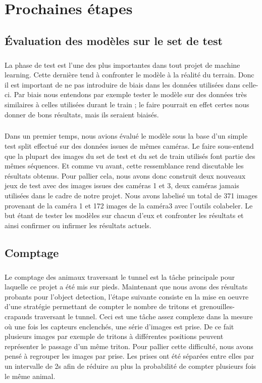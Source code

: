 \chapter{Prochaines étapes}\label{chap:next_steps}
\section{Évaluation des modèles sur le set de test}
\paragraph{}La phase de test est l’une des plus importantes dans tout projet de machine learning.  Cette dernière tend à confronter le modèle à la réalité du terrain. Donc il est important de ne pas introduire de biais dans les données utilisées dans celle-ci. Par biais nous entendons par exemple tester le modèle sur des données très similaires à celles utilisées durant le train ; le faire pourrait en effet certes nous donner de bons résultats, mais ils seraient biaisés.
\paragraph{} Dans un premier temps, nous avions évalué le modèle sous la base d’un simple test split effectué sur des données issues de mêmes caméras. Le faire sous-entend que la plupart des images du set de test et du set de train utilisés font partie des mêmes séquences. Et comme vu avant,  cette ressemblance rend discutable les résultats obtenus.  Pour pallier cela, nous avons donc construit deux nouveaux jeux de test avec des images issues des caméras 1 et 3, deux caméras jamais utilisées dans le cadre de notre projet. Nous avons labelisé un total de 371 images provenant de la caméra 1  et 172 images de la caméra3 avec l’outils colabeler. Le but étant  de tester les modèles sur chacun d’eux et confronter les résultats et ainsi confirmer ou infirmer les résultats actuels.
\section{Comptage}\label{anal:comptage}
\paragraph{} Le comptage des animaux traversant le tunnel est la tâche principale pour laquelle ce projet a été mis sur pieds. Maintenant que nous avons des résultats probants pour l'object detection, l'étape suivante consiste en la mise en oeuvre d'une stratégie permettant de compter le nombre de tritons et grenouilles-crapauds traversant le tunnel. Ceci est une tâche assez complexe dans la mesure où une fois les capteurs enclenchés, une série d'images est prise. De ce fait plusieurs images par exemple de tritons à différentes positions peuvent représenter le passage d'un même triton. Pour pallier cette difficulté, nous avons pensé à regrouper les images par prise. Les prises ont été séparées entre elles par un intervalle de 2s afin de réduire au plus la probabilité de compter plusieurs fois le même animal. 

